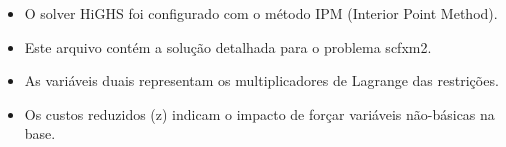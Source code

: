 \documentclass[12pt]{article}
\begin{document}
\begin{itemize}
\item O solver HiGHS foi configurado com o método IPM (Interior Point Method).
\item Este arquivo contém a solução detalhada para o problema scfxm2.
\item As variáveis duais representam os multiplicadores de Lagrange das restrições.
\item Os custos reduzidos (z) indicam o impacto de forçar variáveis não-básicas na base.
\end{itemize}
\end{document}
